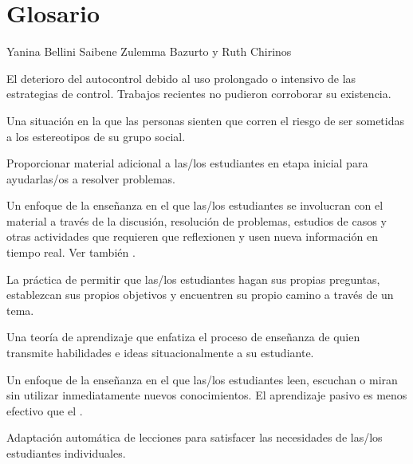 \chapter{Glosario}\label{s:gloss}

\begin{reveiwer}
{Yanina Bellini Saibene}
{Zulemma Bazurto y Ruth Chirinos}
\end{reveiwer}


\begin{description}

 El deterioro del autocontrol debido al uso prolongado o intensivo de las estrategias de control.
Trabajos recientes no pudieron corroborar su existencia.

 Una situación en la que las personas sienten que corren el riesgo de ser sometidas a los estereotipos de su grupo social.

 Proporcionar material adicional a las/los estudiantes
en etapa inicial para ayudarlas/os a resolver problemas.

 Un enfoque de la enseñanza en el que
las/los estudiantes se involucran con el material a través de la discusión, resolución de problemas, estudios de casos
y otras actividades que requieren que reflexionen y usen nueva información en
tiempo real. Ver también .

 La práctica de permitir que 
las/los estudiantes hagan sus propias preguntas, establezcan sus propios objetivos y encuentren su propio camino a través de un tema.

 Una teoría de
aprendizaje que enfatiza el proceso de enseñanza de quien transmite habilidades e ideas
situacionalmente a su estudiante.

 Un enfoque de la enseñanza en el que las/los 
estudiantes leen, escuchan o miran sin utilizar inmediatamente nuevos conocimientos. 
El aprendizaje pasivo es menos efectivo que el .

 Adaptación automática de lecciones para 
satisfacer las necesidades de las/los estudiantes individuales.


\end{description}
